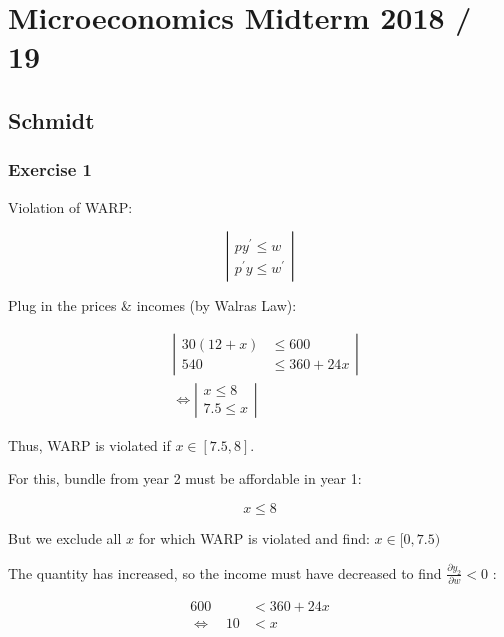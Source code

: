 \section{Microeconomics Midterm 2018 / 19}

{
\subsection*{Schmidt}

{
\subsubsection*{Exercise 1}

\begin{enumerate}[label=(\alph*)]
{\item 
Violation of WARP:

$$
\left|\begin{array}{l}
p y^{\prime} \leqslant w \\
p^{\prime} y \leqslant w^{\prime}
\end{array}\right|
$$

Plug in the prices \& incomes (by Walras Law):

$$
\begin{aligned}
& \left|\begin{array}{rl}
30(12+x) & \leqslant 600 \\
540 & \leqslant 360+24 x
\end{array}\right| \\
& \Leftrightarrow\left|\begin{array}{c}
x \leq 8 \\
7.5 \leqslant x
\end{array}\right|
\end{aligned}
$$

Thus, WARP is violated if $x \in[7.5,8]$.
}
{\item 
For this, bundle from year 2 must be affordable in year 1:

$$
x \leq 8
$$

But we exclude all $x$ for which WARP is violated and find: $x \in[0,7.5)$
}
{\item 
The quantity has increased, so the income must have decreased to find $\frac{\partial y_{2}}{\partial w}<0$ :

$$
\begin{aligned}
600 & <360+24 x \\
\Leftrightarrow \quad 10 & <x
\end{aligned}
$$
}
\end{enumerate}
}
{
}}
